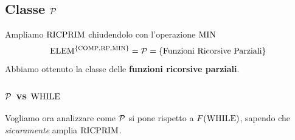 \subsection{Classe $\mathcal{P}$}
Ampliamo $\text{RICPRIM}$ chiudendolo con l'operazione $\operatorname{MIN}$
$$ \text{ELEM}^{\{\text{COMP}, \text{RP}, \operatorname{MIN}\}} = \mathcal{P} = \{\text{Funzioni Ricorsive Parziali}\}$$
Abbiamo ottenuto la classe delle \textbf{funzioni ricorsive parziali}.

\subsubsection{$\mathcal{P}$ vs $\text{WHILE}$}

Vogliamo ora analizzare come $\mathcal{P}$ si pone rispetto a $F(\text{WHILE})$, sapendo che \textit{sicuramente} amplia $\text{RICPRIM}$.\\

